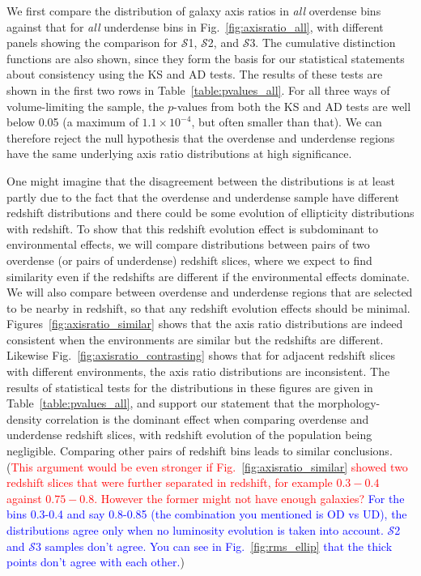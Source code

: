 \documentclass[twocolumn,useAMS,usenatbib]{mn2e}
\newcommand{\rachel}[1]{{\textcolor{red}{#1}}}
\newcommand{\arun}[1]{{\textcolor{blue}{#1}}}
\newcommand{\s}{\ensuremath{\mathcal{S}}}
\begin{document}
We first compare the distribution of galaxy axis ratios in \emph{all}
overdense bins against that for \emph{all} underdense bins in
Fig.~\ref{fig:axisratio_all}, with different panels showing the
comparison for \s1, \s2, and \s3. 
The cumulative distinction functions are also shown, since they form
the basis for our statistical statements about consistency using the
KS and AD tests.  The results of these tests are shown in the first
two rows in Table~\ref{table:pvalues_all}.  For all three ways of
volume-limiting the sample, the $p$-values from both the KS and AD
tests are well below 0.05 (a maximum of $1.1\times 10^{-4}$, but often
smaller than that).  We can therefore reject the null hypothesis that
the overdense and underdense regions have the same underlying axis
ratio distributions at high significance.

One might imagine that the disagreement between the distributions is
at least partly due to the fact that the overdense and underdense
sample have different redshift distributions and there could be some
evolution of ellipticity distributions with redshift. 
To show that this redshift evolution effect is subdominant to
environmental effects, we will compare distributions between pairs of
two overdense (or pairs of underdense) redshift slices, where we
expect to find similarity even if the redshifts are different if the
environmental effects dominate.  We will also compare between
overdense and underdense regions that are selected to be nearby in
redshift, so that any redshift evolution effects should be minimal. 
Figures~\ref{fig:axisratio_similar}
shows that the axis ratio
distributions are indeed consistent when the environments are similar
but the redshifts are different.  Likewise
Fig.~\ref{fig:axisratio_contrasting} shows that for adjacent redshift
slices with different environments, the axis ratio distributions are
inconsistent.  The results of statistical tests for the distributions
in these figures are given in Table~\ref{table:pvalues_all}, and
support our statement that the morphology-density
correlation is the dominant effect when comparing overdense and
underdense redshift slices, with redshift evolution of the
population being negligible. 
Comparing other pairs of redshift
bins leads to similar conclusions. (\rachel{This argument would be even stronger if
  Fig.~\ref{fig:axisratio_similar} showed two redshift slices that were
  further separated in redshift, for example $0.3-0.4$ against
  $0.75-0.8$.  However the former might not have enough galaxies?}
  \arun{For the bins 0.3-0.4 and say 0.8-0.85 (the combination you mentioned is OD vs UD), the distributions agree only when no luminosity evolution is taken into account.
        \s2 and \s3 samples don't agree. You can see in Fig.~\ref{fig:rms_ellip} that the thick points don't agree with each other.})
\end{document}
